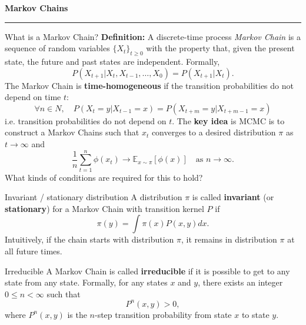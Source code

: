 \documentclass[aspectratio=169]{beamer}
\begin{document}
\begin{frame}
	\vspace{2cm}
	\begin{center}
		{\Huge\textbf{\textcolor{copenhagenred}{Markov Chains}}}
		\vspace{1cm}

		\rule{4cm}{3pt}
		\vspace{2cm}
	\end{center}
\end{frame}

\begin{frame}{What is a Markov Chain?}
    \textbf{Definition:} A discrete-time process \textit{Markov Chain} is a sequence of random variables $\{X_t\}_{t \geq 0}$ with the property that, given the present state, the future and past states are independent. Formally,
    \begin{equation*}
        P(X_{t+1} | X_t, X_{t-1}, \ldots, X_0) = P(X_{t+1} | X_t).
    \end{equation*}
    The Markov Chain is \textbf{time-homogeneous} if the transition probabilities do not depend on time $t$:
    \begin{equation*}
        \forall n \in N, \quad P(X_t = y | X_{t-1} = x) = P(X_{t+m} = y | X_{t+m-1} = x)
    \end{equation*}
    i.e. transition probabilities do not depend on $t$.
    The \textbf{key idea} is MCMC is to construct a Markov Chains such that $x_t$ converges 
    to a desired distribution $\pi$ as $t \to \infty$ and
    \begin{equation*}
        \frac{1}{n} \sum_{t=1}^n \phi(x_t) \to \mathbb{E}_{x \sim \pi}[\phi(x)] \quad \text{as } n \to \infty.
    \end{equation*}
    What kinds of conditions are required for this to hold?
\end{frame}

\begin{frame}{Invariant / stationary distribution}
    A distribution $\pi$ is called \textbf{invariant} (or \textbf{stationary}) for a Markov Chain with transition kernel $P$ if
    \begin{equation*}
        \pi(y) = \int \pi(x) P(x, y) dx.
    \end{equation*}
    Intuitively, if the chain starts with distribution $\pi$, it remains in distribution $\pi$ at all future times.
\end{frame}

\begin{frame}{Irreducible}
    A Markov Chain is called \textbf{irreducible} if it is possible to get to any state 
    from any state. Formally, for any states $x$ and $y$, there exists an integer
    $0 \leq n < \infty$ such that
    \begin{equation*}
        P^n(x, y) > 0,
    \end{equation*}
    where $P^n(x, y)$ is the $n$-step transition probability from state $x$ to state $y$.
\end{frame}
\end{document}
